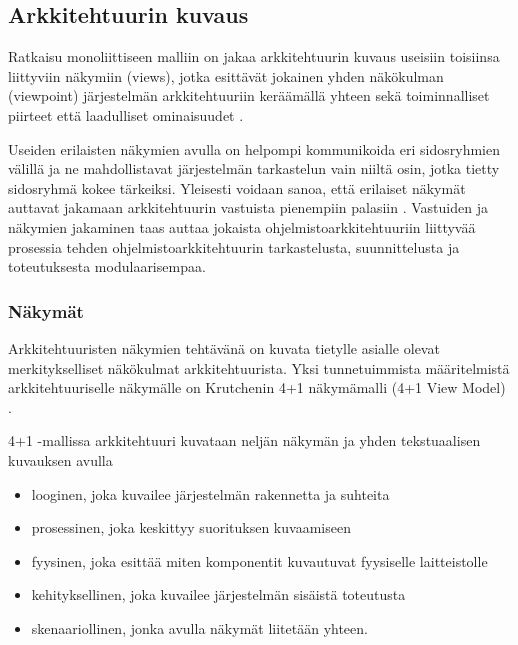 \documentclass[finnish]{tktltiki2}
\numberwithin{table}{section}
\theoremstyle{definition}
\theoremstyle{remark}
\begin{document}
\subsection{Arkkitehtuurin kuvaus}

Ratkaisu monoliittiseen malliin on jakaa arkkitehtuurin kuvaus useisiin toisiinsa liittyviin näkymiin (views), jotka esittävät jokainen yhden näkökulman (viewpoint) järjestelmän arkkitehtuuriin keräämällä yhteen sekä toiminnalliset piirteet että laadulliset ominaisuudet \citetext{\citealp{Ran:1998:ASV:288408.288438}; \citealp[s. 33-34]{Rozanski:2011:SSA:2072649}; \citealp[s. 8-9]{gorton_understanding_2011}; }.

Useiden erilaisten näkymien avulla on helpompi kommunikoida eri sidosryhmien välillä ja ne mahdollistavat järjestelmän tarkastelun vain niiltä osin, jotka tietty sidosryhmä kokee tärkeiksi. Yleisesti voidaan sanoa, että erilaiset näkymät auttavat jakamaan arkkitehtuurin vastuista pienempiin palasiin \citep[s. 2]{Galster:2011:DTC:2031759.2031761}. Vastuiden ja näkymien jakaminen taas auttaa jokaista ohjelmistoarkkitehtuuriin liittyvää prosessia tehden ohjelmistoarkkitehtuurin tarkastelusta, suunnittelusta ja toteutuksesta modulaarisempaa.


\subsubsection{Näkymät}
Arkkitehtuuristen näkymien tehtävänä on kuvata tietylle asialle olevat merkitykselliset näkökulmat arkkitehtuurista. Yksi tunnetuimmista määritelmistä arkkitehtuuriselle näkymälle on Krutchenin 4+1 näkymämalli (4+1 View Model) \citep{krutchen1995}. 

4+1 -mallissa arkkitehtuuri kuvataan neljän näkymän ja yhden tekstuaalisen kuvauksen avulla 

\begin{itemize}
	\item looginen, joka kuvailee järjestelmän rakennetta ja suhteita
	\item prosessinen, joka keskittyy suorituksen kuvaamiseen
	\item fyysinen, joka esittää miten komponentit kuvautuvat fyysiselle laitteistolle
	\item kehityksellinen, joka kuvailee järjestelmän sisäistä toteutusta
	\item skenaariollinen, jonka avulla näkymät liitetään yhteen.
\end{itemize}
\end{document}
